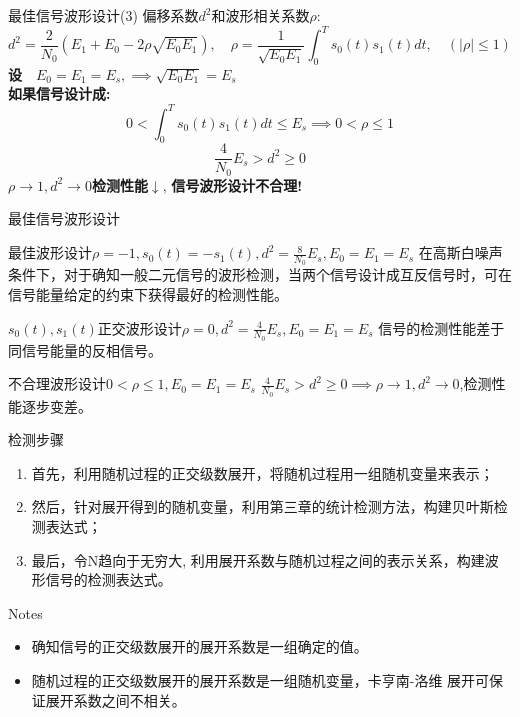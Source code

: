\begin{frame}{最佳信号波形设计(3)}
偏移系数$d^2$和波形相关系数$\rho$:
\[d^2=\frac{2}{N_0}(E_1+E_0-2\rho\sqrt{E_0E_1}),\quad \rho=\frac{1}{\sqrt{E_{0}E_{1}}}\int_{0}^{T}s_0(t)s_1(t)dt,\quad(|\rho|\le 1) \]
\textbf{设}$\quad E_0=E_1=E_s,\implies\sqrt{E_0E_1}=E_s$\\
\textbf{如果信号设计成:} 
\[0<\int_{0}^{T}s_0(t)s_1(t)dt\le E_s\implies 0<\rho\le 1 \]
\[\frac{4}{N_0}E_s>d^2\ge 0\]
$\rho\to 1, d^2\to 0$\textbf{检测性能}$\downarrow$, \textbf{信号波形设计不合理!}
\end{frame}

\begin{frame}{最佳信号波形设计}
\begin{block}{最佳波形设计$\rho=-1,s_0(t)=-s_1(t),d^2=\frac{8}{N_0}E_s,E_0=E_1=E_s$}
	在高斯白噪声条件下，对于确知一般二元信号的波形检测，当两个信号设计成互反信号时，可在信号能量给定的约束下获得最好的检测性能。
\end{block}
\begin{block}{$s_0(t),s_1(t)$正交波形设计$\rho=0,d^2=\frac{4}{N_0}E_s,E_0=E_1=E_s$}
	信号的检测性能差于同信号能量的反相信号。
\end{block}
\begin{block}{不合理波形设计$0<\rho\le 1,E_0=E_1=E_s$}
	$\frac{4}{N_0}E_s>d^2\ge 0\implies\rho\to 1,d^2\to 0$,检测性能逐步变差。
\end{block}
\end{frame}

\begin{frame}{检测步骤}
\begin{enumerate}
	\setlength{\itemsep}{.5cm}
	\item 首先，利用随机过程的正交级数展开，将随机过程用一组随机变量来表示；
	\item 然后，针对展开得到的随机变量，利用第三章的统计检测方法，构建贝叶斯检测表达式；
	\item 最后，令N趋向于无穷大, 利用展开系数与随机过程之间的表示关系，构建波形信号的检测表达式。
\end{enumerate}
\begin{block}{Notes}
	\begin{itemize}
		\item 确知信号的正交级数展开的展开系数是一组确定的值。
		\item 随机过程的正交级数展开的展开系数是一组随机变量，卡亨南-洛维
		展开可保证展开系数之间不相关。
	\end{itemize}
\end{block}
\end{frame}
